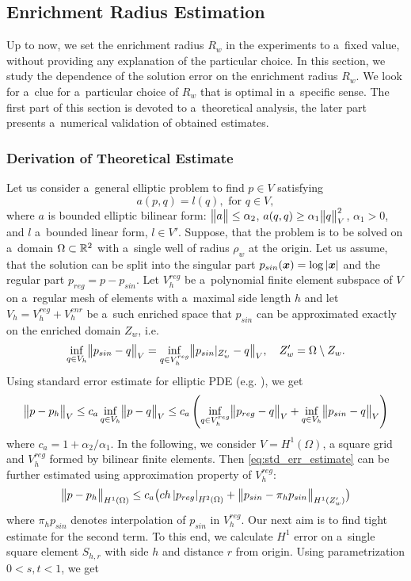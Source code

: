 \subsection{Enrichment Radius Estimation} \label{sec:enrichemnt_radius}
Up to now, we set the enrichment radius $R_w$ in the experiments to a~fixed value, without providing any explanation of the particular choice.
In this section, we study the dependence of the solution error on the enrichment radius $R_w$.
We look for a~clue for a~particular choice of $R_w$ that is optimal in a~specific sense.
The first part of this section is devoted to a~theoretical analysis, the later part presents a~numerical validation of obtained estimates.

\subsubsection{Derivation of Theoretical Estimate}
Let us consider a~general elliptic problem to find $p\in V$ satisfying
\[
   a(p, q) = l(q), \text{ for } q \in V,
\]
where $a$ is bounded elliptic bilinear form: $\bigl\Vert a\bigr\Vert\le \alpha_2$, $a(q, q) \ge \alpha_1 \bigl\Vert q\bigr\Vert_V^2$, $\alpha_1>0$, and $l$ a~bounded linear form, $l\in V'$. 
Suppose, that the problem is to be solved on a~domain $\Omega \subset {\mathbb{R}}^2$ with a~single well of radius $\rho_w$ at the origin. 
Let us assume, that the solution can be split into the singular part $p_{sin}(\mathbf{\boldsymbol{x}})= \log |\mathbf{\boldsymbol{x}}|$ and the regular part $p_{reg}=p-p_{sin}$.
Let $V^{reg}_h$ be a~polynomial finite element subspace of $V$ on a~regular mesh of elements with a~maximal side length $h$
and let $V_h=V^{reg}_h + V^{enr}_h$ be a~such enriched space that $p_{sin}$ can be approximated exactly on the enriched domain $Z_w$, i.e.
\begin{equation}
   \inf_{q\in V_h} \bigl\Vert p_{sin} - q\bigr\Vert_V = \inf_{q\in V^{reg}_h} \bigl\Vert p_{sin}|_{Z'_w} - q\bigr\Vert_V, \quad Z'_w = \Omega\setminus Z_w.
\end{equation}
Using standard error estimate for elliptic PDE (e.g. \cite[Theorem 13.1]{ciarlet_basic_1991}), we get
\begin{equation}
    \label{eq:std_err_estimate}
    \bigl\Vert p - p_h\bigr\Vert_{V} \le c_a \inf_{q \in V_h} \bigl\Vert p - q\bigr\Vert_{V} 
    \le c_a \left(\inf_{q \in V^{reg}_h} \bigl\Vert p_{reg} - q\bigr\Vert_{V} + \inf_{q \in V_h} \bigl\Vert p_{sin} - q\bigr\Vert_{V} \right)   
\end{equation}
where $c_a=1+\alpha_2/\alpha_1$.
In the following, we consider $V=H^1(\Omega)$, a square grid and $V^{reg}_h$ formed by bilinear finite elements. 
Then \eqref{eq:std_err_estimate} can be further estimated using approximation property of $V^{reg}_h$:
\begin{equation}
    \label{eq:particular_estimate}
    \bigl\Vert p - p_h\bigr\Vert_{H^1(\Omega)} \le c_a \big(c h \left|p_{reg}\right|_{H^2(\Omega)} + \bigl\Vert p_{sin} - \pi_h p_{sin}\bigr\Vert_{H^1(Z'_w)} \big)
\end{equation}
where $\pi_h p_{sin}$ denotes interpolation of $p_{sin}$ in $V^{reg}_h$. Our next aim is to find tight estimate for the second term.
To this end, we calculate $H^1$ error on a~single square element $S_{h,r}$ with side $h$ and distance $r$ from origin.
Using parametrization $0<s,t<1$,  we get


